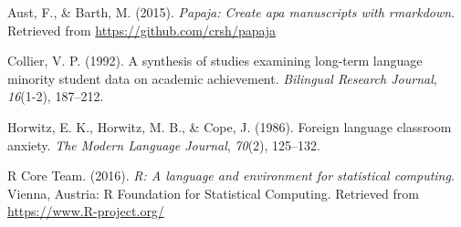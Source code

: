 \documentclass[english,floatsintext,man]{apa6}
\theoremstyle{definition}
\theoremstyle{definition}
\theoremstyle{definition}
\theoremstyle{remark}
\begin{document}
\hypertarget{ref-aust2015papaja}{}
Aust, F., \& Barth, M. (2015). \emph{Papaja: Create apa manuscripts with
rmarkdown}. Retrieved from \url{https://github.com/crsh/papaja}

\hypertarget{ref-collier1992synthesis}{}
Collier, V. P. (1992). A synthesis of studies examining long-term
language minority student data on academic achievement. \emph{Bilingual
Research Journal}, \emph{16}(1-2), 187--212.

\hypertarget{ref-horwitz1986foreign}{}
Horwitz, E. K., Horwitz, M. B., \& Cope, J. (1986). Foreign language
classroom anxiety. \emph{The Modern Language Journal}, \emph{70}(2),
125--132.

\hypertarget{ref-R}{}
R Core Team. (2016). \emph{R: A language and environment for statistical
computing}. Vienna, Austria: R Foundation for Statistical Computing.
Retrieved from \url{https://www.R-project.org/}
\end{document}
